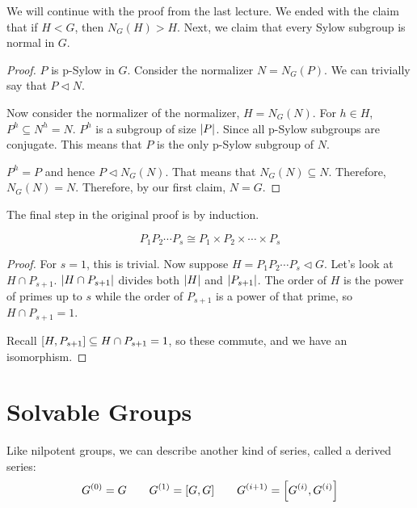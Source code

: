 \documentclass[a4paper,twoside,master.tex]{subfiles}
\begin{document}

We will continue with the proof from the last lecture. We ended with the claim that if $ H < G $, then $ N_G(H) > H $. Next, we claim that every Sylow subgroup is normal in $ G $.
\begin{proof}
    $ P $ is p-Sylow in $ G $. Consider the normalizer $ N = N_G(P) $. We can trivially say that $ P \triangleleft N $.
    
    Now consider the normalizer of the normalizer, $ H = N_G(N) $. For $ h \in H $, $ P^h \subseteq N^h = N $. $ P^h $ is a subgroup of size $ \abs{P} $. Since all p-Sylow subgroups are conjugate. This means that $ P $ is the only p-Sylow subgroup of $ N $.

    $ P^h = P $ and hence $ P \triangleleft N_G(N) $. That means that $ N_G(N) \subseteq N $. Therefore, $ N_G(N) = N $. Therefore, by our first claim, $ N = G $. 
\end{proof}

The final step in the original proof is by induction.

\begin{claim}
    \begin{equation}
        P_1 P_2 \cdots P_s \cong P_1 \times P_2 \times \cdots \times P_s
    \end{equation}
\end{claim}
\begin{proof}
    For $ s = 1 $, this is trivial. Now suppose $ H = P_1 P_2 \cdots P_s \triangleleft G $. Let's look at $ H \cap P_{s+1} $. $ \abs{H \cap P_{s+1}} $ divides both $ \abs{H} $ and $ \abs{P_{s+1}} $. The order of $ H $ is the power of primes up to $ s $ while the order of $ P_{s+1} $ is a power of that prime, so $ H \cap P_{s+1} = 1 $.

    Recall $ \comm{H}{P_{s+1}} \subseteq H \cap P_{s+1} = 1 $, so these commute, and we have an isomorphism.
\end{proof}


\section{Solvable Groups}
\label{sec:solvable_groups}

Like nilpotent groups, we can describe another kind of series, called a derived series:
\begin{equation}
    G^{(0)} = G\qquad G^{(1)} = \comm{G}{G}\qquad G^{(i+1)} = \comm{G^{(i)}}{G^{(i)}}
\end{equation}
\end{document}
